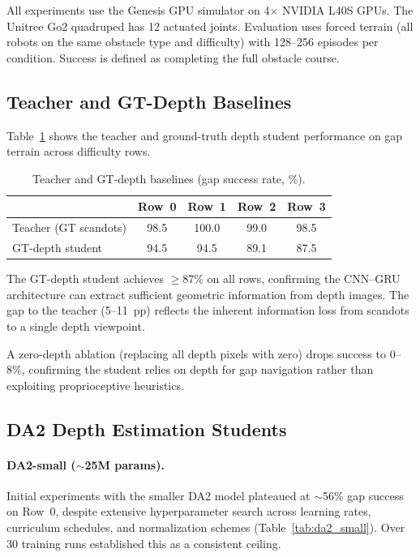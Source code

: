 \documentclass[10pt,twocolumn]{article}
\begin{document}
All experiments use the Genesis GPU simulator on 4$\times$ NVIDIA
L40S GPUs.  The Unitree Go2 quadruped has 12 actuated joints.
Evaluation uses forced terrain (all robots on the same obstacle type
and difficulty) with 128--256 episodes per condition.  Success is
defined as completing the full obstacle course.

\subsection{Teacher and GT-Depth Baselines}

Table~\ref{tab:baselines} shows the teacher and ground-truth depth
student performance on gap terrain across difficulty rows.

\begin{table}[h]
  \centering
  \caption{Teacher and GT-depth baselines (gap success rate, \%).}
  \label{tab:baselines}
  \small
  \begin{tabular}{@{}lcccc@{}}
    \toprule
& Row~0 & Row~1 & Row~2 & Row~3 \\
\midrule
    Teacher (GT scandots) & 98.5 & 100.0 & 99.0 & 98.5 \\
    GT-depth student & 94.5 & 94.5 & 89.1 & 87.5 \\
    \bottomrule
  \end{tabular}
\end{table}

The GT-depth student achieves $\geq$87\% on all rows, confirming
the CNN--GRU architecture can extract sufficient geometric
information from depth images.  The gap to the teacher (5--11~pp)
reflects the inherent information loss from scandots to a single
depth viewpoint.

A zero-depth ablation (replacing all depth pixels with zero)
drops success to 0--8\%, confirming the student relies on depth
for gap navigation rather than exploiting proprioceptive heuristics.

\subsection{DA2 Depth Estimation Students}
\label{sec:da2_results}

\paragraph{DA2-small ($\sim$25M params).}
Initial experiments with the smaller DA2 model plateaued at
$\sim$56\% gap success on Row~0, despite extensive
hyperparameter search across learning rates, curriculum schedules,
and normalization schemes (Table~\ref{tab:da2_small}).
Over 30 training runs established this as a consistent ceiling.
\end{document}

